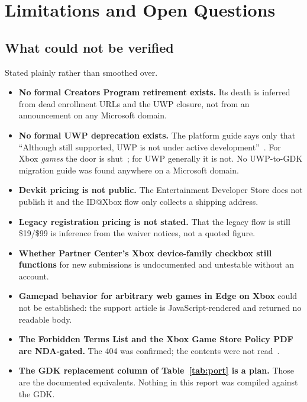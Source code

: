 \documentclass[10pt,letterpaper,twocolumn]{article}
\begin{document}
\section{Limitations and Open Questions}
\label{sec:limits}

\subsection{What could not be verified}

Stated plainly rather than smoothed over.

\begin{itemize}
  \item \textbf{No formal Creators Program retirement exists.} Its death is inferred from dead enrollment URLs and the UWP closure, not from an announcement on any Microsoft domain.
  \item \textbf{No formal UWP deprecation exists.} The platform guide says only that ``Although still supported, UWP is not under active development''~\cite{msUwpGuide}. For Xbox \emph{games} the door is shut~\cite{msUwpFaq}; for UWP generally it is not. No UWP-to-GDK migration guide was found anywhere on a Microsoft domain.
  \item \textbf{Devkit pricing is not public.} The Entertainment Developer Store does not publish it and the ID@Xbox flow only collects a shipping address.
  \item \textbf{Legacy registration pricing is not stated.} That the legacy flow is still \$19/\$99 is inference from the waiver notices, not a quoted figure.
  \item \textbf{Whether Partner Center's Xbox device-family checkbox still functions} for new submissions is undocumented and untestable without an account.
  \item \textbf{Gamepad behavior for arbitrary web games in Edge on Xbox} could not be established: the support article is JavaScript-rendered and returned no readable body.
  \item \textbf{The Forbidden Terms List and the Xbox Game Store Policy PDF are NDA-gated.} The 404 was confirmed; the contents were not read~\cite{msForbiddenTerms}.
  \item \textbf{The GDK replacement column of Table~\ref{tab:port} is a plan.} Those are the documented equivalents. Nothing in this report was compiled against the GDK.
\end{itemize}
\end{document}
